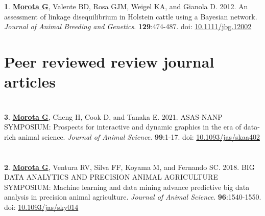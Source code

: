 \documentclass[margin,line,10pt]{res}
\newenvironment{list1}{
  \begin{list}{\ding{113}}{%
      \setlength{\itemsep}{0in}
      \setlength{\parsep}{0in} \setlength{\parskip}{0in}
      \setlength{\topsep}{0in} \setlength{\partopsep}{0in} 
      \setlength{\leftmargin}{0.17in}}}{\end{list}}
\begin{document}
\begin{resume}
\section{}
\begin{list1} 
\item [{\bf 1}.] {\bf \underline{Morota G}}, Valente BD, Rosa GJM, Weigel KA, and Gianola D. 2012.  
An assessment of linkage disequilibrium in Holstein cattle using a Bayesian network. \emph{Journal of Animal Breeding and Genetics}. {\bf 129}:474-487. doi: \textcolor{blue}{\href{http://dx.doi.org/10.1111/jbg.12002}{10.1111/jbg.12002}}
\end{list1}





\section{\sc Peer reviewed review journal articles}

\vspace{1.5cm}

\section{}
\begin{list1}

 \item  [{\bf 3}.] \textbf{\underline{Morota G}}, Cheng H, Cook D, and Tanaka E. 2021. ASAS-NANP SYMPOSIUM: Prospects for interactive and dynamic graphics in the era of data-rich animal science. \emph{Journal of Animal Science}.  \textbf{99}:1-17. doi: \textcolor{blue}{\href{https://doi.org/10.1093/jas/skaa402}{10.1093/jas/skaa402}} 
   
\end{list1}


\section{}
\begin{list1}

 \item  [{\bf 2}.] \textbf{\underline{Morota G}}, Ventura RV, Silva FF, Koyama M, and Fernando SC. 2018. BIG DATA ANALYTICS AND PRECISION ANIMAL AGRICULTURE SYMPOSIUM: Machine learning and data mining advance predictive big data analysis in precision animal agriculture. \emph{Journal of Animal Science}. \textbf{96}:1540-1550. doi: \textcolor{blue}{\href{http://dx.doi.org/10.1093/jas/sky014}{10.1093/jas/sky014}}
   

\end{list1}
\end{resume}
\end{document}

